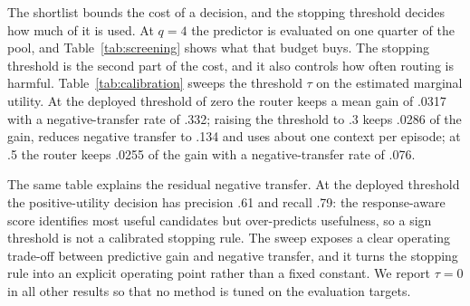 The shortlist bounds the cost of a decision, and the stopping threshold decides how
much of it is used. At $q=4$ the predictor is evaluated on one quarter of the
pool, and Table~\ref{tab:screening} shows what that budget buys. The stopping
threshold is the second part of the cost, and it also controls how often
routing is harmful. Table~\ref{tab:calibration} sweeps the
threshold $\tau$ on the estimated marginal utility. At the deployed threshold
of zero the router keeps a mean gain of .0317 with a negative-transfer rate of
.332; raising the threshold to .3 keeps .0286 of the gain, reduces negative
transfer to .134 and uses about one context per episode; at .5 the router keeps
.0255 of the gain with a negative-transfer rate of .076.

The same table explains the residual negative transfer. At the deployed
threshold the positive-utility decision has precision .61 and recall .79: the
response-aware score identifies most useful candidates but over-predicts
usefulness, so a sign threshold is not a calibrated stopping rule. The sweep
exposes a clear operating trade-off between predictive gain and negative
transfer, and it turns the stopping rule into an explicit operating point
rather than a fixed constant. We report $\tau=0$ in all other results so that no
method is tuned on the evaluation targets.



